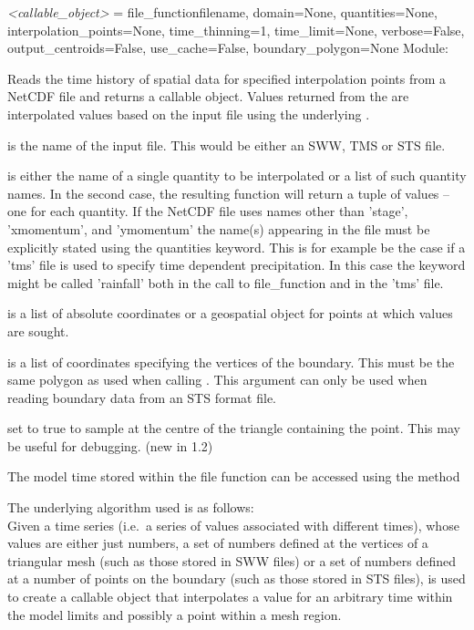 \documentclass{manual}
\begin{document}
\begin{funcdesc}{\emph{<callable_object>} = file_function}{filename,
                                domain=None,
                                quantities=None,
                                interpolation_points=None,
                                time_thinning=1,
                                time_limit=None,
                                verbose=False,
                                output_centroids=False,
                                use_cache=False,
                                boundary_polygon=None}
Module: 

Reads the time history of spatial data for specified interpolation points from
a NetCDF file and returns a callable object.  Values returned from the 
are interpolated values based on the input file using the underlying .

 is the name of the input file.
This would be either an SWW, TMS or STS file.

 is either the name of a single quantity to be
interpolated or a list of such quantity names. In the second case, the resulting
function will return a tuple of values -- one for each quantity.
If the NetCDF file uses names other than 'stage', 'xmomentum', and 'ymomentum'
the name(s) appearing in the file must be explicitly stated using the
quantities keyword. This is for example be the case if a 'tms' file is used
to specify time dependent precipitation. In this case the keyword might be called 'rainfall' both in the call to file\_function and in the 'tms' file.

 is a list of absolute coordinates or a
geospatial object for points at which values are sought.

 is a list of coordinates specifying the vertices of the boundary.
This must be the same polygon as used when calling .
This argument can only be used when reading boundary data from an STS format file.

 set to true to sample at the centre of the triangle containing the point.
This may be useful for debugging. (new in 1.2)

The model time stored within the file function can be accessed using
the method 

The underlying algorithm used is as follows:\\
Given a time series (i.e.\ a series of values associated with
different times), whose values are either just numbers, a set of
numbers defined at the vertices of a triangular mesh (such as those
stored in SWW files) or a set of
numbers defined at a number of points on the boundary (such as those
stored in STS files),  is used to
create a callable object that interpolates a value for an arbitrary
time  within the model limits and possibly a point 
within a mesh region.


\end{funcdesc}
\end{document}
